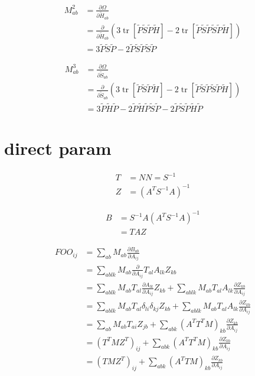 \documentclass{article}
\newcommand{\tr}{\operatorname{tr}}
\begin{document}
\begin{align*}
    M^2_{ab} &= \frac{\partial \Omega}{\partial \tilde H_{ab}}\\
    & = \frac{\partial}{\partial \tilde H_{ab}} \left (3\tr[\tilde P \tilde S \tilde P \tilde H ] - 2\tr[\tilde P \tilde S \tilde P \tilde S \tilde P \tilde H] \right )\\
    & = 3 \tilde P \tilde S \tilde P - 2 \tilde P \tilde S \tilde P \tilde S \tilde P
\end{align*}

\begin{align*}
    M^3_{ab} &= \frac{\partial \Omega}{\partial \tilde S_{ab}}\\
    & = \frac{\partial}{\partial \tilde S_{ab}} \left (3\tr[\tilde P \tilde S \tilde P \tilde H ] - 2\tr[\tilde P \tilde S \tilde P \tilde S \tilde P \tilde H] \right )\\
    & =  3\tilde P \tilde H  \tilde P - 2 \tilde P \tilde H\tilde P\tilde  S\tilde  P  - 2 \tilde P\tilde S \tilde P\tilde H\tilde P
\end{align*}


\newpage
\section*{direct param}

\begin{align*}
T &= NN = S^{-1}\\
Z &= (A^T S^{-1} A) ^{-1}
\end{align*}


\begin{align*}
B &= S^{-1} A (A^T S^{-1} A) ^{-1}\\
  &= T A Z
\end{align*}

\begin{align*}
FOO_{ij} &= \sum_{ab} M_{ab} \frac{\partial B_{ab}}{\partial A_{ij}} \\
         &= \sum_{ablk} M_{ab} \frac{\partial}{\partial A_{ij}}  T_{al} A_{lk} Z_{kb}\\
         &= \sum_{ablk} M_{ab} T_{al} \frac{\partial  A_{lk}}{\partial A_{ij}} Z_{kb} + \sum_{ablk} M_{ab} T_{al} A_{lk} \frac{\partial Z_{kb}}{\partial A_{ij}} \\
         &= \sum_{ablk} M_{ab} T_{al} \delta_{li} \delta_{kj} Z_{kb} + \sum_{ablk} M_{ab} T_{al} A_{lk} \frac{\partial Z_{kb}}{\partial A_{ij}} \\
         &= \sum_{ab} M_{ab} T_{ai} Z_{jb} + \sum_{abk} (A^T T^T M)_{kb} \frac{\partial Z_{kb}}{\partial A_{ij}} \\
         &= (T^T M Z^T)_{ij} + \sum_{abk} (A^T T^T M)_{kb} \frac{\partial Z_{kb}}{\partial A_{ij}} \\
         &= (T M Z^T)_{ij} + \sum_{abk} (A^T T M)_{kb} \frac{\partial Z_{kb}}{\partial A_{ij}} \\
\end{align*}
\end{document}
